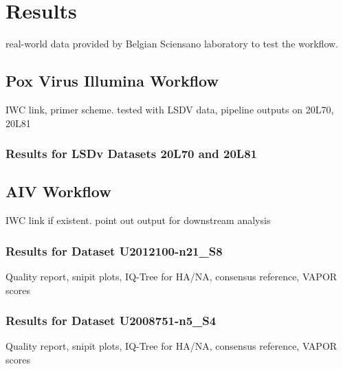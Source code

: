 \chapter{Results}\label{chap:results}

real-world data provided by Belgian Sciensano laboratory to test the workflow.

\section{Pox Virus Illumina Workflow}
IWC link, primer scheme.
tested with LSDV data,
pipeline outputs on 20L70, 20L81

\subsection{Results for LSDv Datasets 20L70 and 20L81}

\section{AIV Workflow}
IWC link if existent.
point out output for downstream analysis

\subsection{Results for Dataset U2012100-n21\_S8} %
Quality report, snipit plots, IQ-Tree for HA/NA, consensus reference, VAPOR scores

\subsection{Results for Dataset U2008751-n5\_S4}
Quality report, snipit plots, IQ-Tree for HA/NA, consensus reference, VAPOR scores

